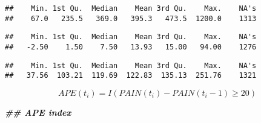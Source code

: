 \documentclass[
  12pt,
]{article}
\newenvironment{Shaded}{\begin{snugshade}}{\end{snugshade}}
\newcommand{\CommentTok}[1]{\textcolor[rgb]{0.56,0.35,0.01}{\textit{#1}}}
\newcommand{\DocumentationTok}[1]{\textcolor[rgb]{0.56,0.35,0.01}{\textbf{\textit{#1}}}}
\newcommand{\FunctionTok}[1]{\textcolor[rgb]{0.13,0.29,0.53}{\textbf{#1}}}
\newcommand{\NormalTok}[1]{#1}
\newcommand{\SpecialCharTok}[1]{\textcolor[rgb]{0.81,0.36,0.00}{\textbf{#1}}}
\begin{document}
\begin{verbatim}
##    Min. 1st Qu.  Median    Mean 3rd Qu.    Max.    NA's 
##    67.0   235.5   369.0   395.3   473.5  1200.0    1313
\end{verbatim}

\begin{Shaded}
\end{Shaded}

\begin{verbatim}
##    Min. 1st Qu.  Median    Mean 3rd Qu.    Max.    NA's 
##   -2.50    1.50    7.50   13.93   15.00   94.00    1276
\end{verbatim}

\begin{Shaded}
\end{Shaded}

\begin{verbatim}
##    Min. 1st Qu.  Median    Mean 3rd Qu.    Max.    NA's 
##   37.56  103.21  119.69  122.83  135.13  251.76    1321
\end{verbatim}

\[
APE(t_i)=I(PAIN(t_i)-PAIN(t_i-1) \geq 20)
\]

\begin{Shaded}
\begin{Highlighting}[]
\DocumentationTok{\#\# APE index}
\end{Highlighting}
\end{Shaded}
\end{document}
